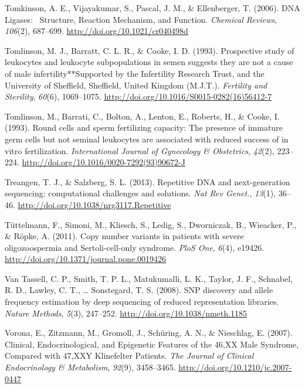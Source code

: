 \documentclass[12pt,twoside]{reedthesis}
\theoremstyle{definition}
\theoremstyle{definition}
\theoremstyle{remark}
\begin{document}
  \hypertarget{ref-Tomkinson2006}{}
  Tomkinson, A. E., Vijayakumar, S., Pascal, J. M., \& Ellenberger, T.
  (2006). DNA Ligases:~ Structure, Reaction Mechanism, and Function.
  \emph{Chemical Reviews}, \emph{106}(2), 687--699.
  \url{http://doi.org/10.1021/cr040498d}
  
  \hypertarget{ref-Tomlinson1993}{}
  Tomlinson, M. J., Barratt, C. L. R., \& Cooke, I. D. (1993). Prospective
  study of leukocytes and leukocyte subpopulations in semen suggests they
  are not a cause of male infertility**Supported by the Infertility
  Research Trust, and the University of Sheffield, Sheffield, United
  Kingdom (M.J.T.). \emph{Fertility and Sterility}, \emph{60}(6),
  1069--1075. \url{http://doi.org/10.1016/S0015-0282(16)56412-7}
  
  \hypertarget{ref-Tomlinson1993a}{}
  Tomlinson, M., Barrati, C., Bolton, A., Lenton, E., Roberts, H., \&
  Cooke, I. (1993). Round cells and sperm fertilizing capacity: The
  presence of immature germ cells but not seminal leukocytes are
  associated with reduced success of in vitro fertilization.
  \emph{International Journal of Gynecology \& Obstetrics}, \emph{42}(2),
  223--224. \url{http://doi.org/10.1016/0020-7292(93)90672-J}
  
  \hypertarget{ref-Treangen2013}{}
  Treangen, T. J., \& Salzberg, S. L. (2013). Repetitive DNA and
  next-generation sequencing: computational challenges and solutions.
  \emph{Nat Rev Genet.}, \emph{13}(1), 36--46.
  \url{http://doi.org/10.1038/nrg3117.Repetitive}
  
  \hypertarget{ref-Tuttelmann2011}{}
  Tüttelmann, F., Simoni, M., Kliesch, S., Ledig, S., Dworniczak, B.,
  Wieacker, P., \& Röpke, A. (2011). Copy number variants in patients with
  severe oligozoospermia and Sertoli-cell-only syndrome. \emph{PloS One},
  \emph{6}(4), e19426. \url{http://doi.org/10.1371/journal.pone.0019426}
  
  \hypertarget{ref-VanTassell2008}{}
  Van Tassell, C. P., Smith, T. P. L., Matukumalli, L. K., Taylor, J. F.,
  Schnabel, R. D., Lawley, C. T., \ldots{} Sonstegard, T. S. (2008). SNP
  discovery and allele frequency estimation by deep sequencing of reduced
  representation libraries. \emph{Nature Methods}, \emph{5}(3), 247--252.
  \url{http://doi.org/10.1038/nmeth.1185}
  
  \hypertarget{ref-Vorona2007}{}
  Vorona, E., Zitzmann, M., Gromoll, J., Schüring, A. N., \& Nieschlag, E.
  (2007). Clinical, Endocrinological, and Epigenetic Features of the 46,XX
  Male Syndrome, Compared with 47,XXY Klinefelter Patients. \emph{The
  Journal of Clinical Endocrinology \& Metabolism}, \emph{92}(9),
  3458--3465. \url{http://doi.org/10.1210/jc.2007-0447}
  
\end{document}
